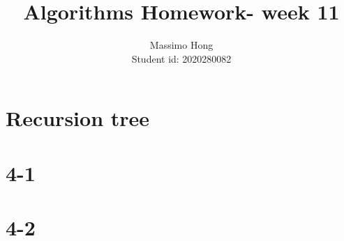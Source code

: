 \documentclass{article}
\title{Algorithms Homework- week 11}
\author{
	Massimo Hong\\
	Student id: 2020280082\\
 }
\begin{document}
\maketitle
\section*{Recursion tree}

\section*{4-1}

\section*{4-2}

\end{document}
